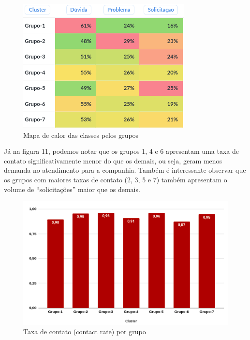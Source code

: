 \documentclass[twocolumn]{rbef}
\newcommand{\1}{\mathbbm{1}}
\begin{document}
\begin{figure}[!htb]
  \centering \includegraphics[scale=0.7]{10. Classificação atendimentos (7 clusters) - table.png}
  \caption{Mapa de calor das classes pelos grupos}
  \label{fig10}
\end{figure}
\newline\linebreak Já na figura 11, podemos notar que os grupos 1, 4 e 6 apresentam uma taxa de contato significativamente menor do que os demais, ou seja, geram menos demanda no atendimento para a companhia. Também é interessante observar que os grupos com maiores taxas de contato (2, 3, 5 e 7) também apresentam o volume de “solicitações” maior que os demais.
\begin{figure}[!htb]
  \centering \includegraphics[scale=0.6]{11. Concat rate (7 clusters).png}
  \caption{Taxa de contato (contact rate) por grupo}
  \label{fig11}
\end{figure}
\end{document}
